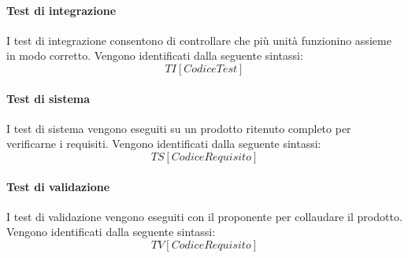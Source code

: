 	\paragraph{Test di integrazione}
		I test di integrazione consentono di controllare che più unità funzionino assieme in modo corretto. Vengono identificati dalla seguente sintassi:
			\[TI[Codice Test]\]
	\paragraph{Test di sistema}
		I test di sistema vengono eseguiti su un prodotto ritenuto completo per verificarne i requisiti. Vengono identificati dalla seguente sintassi:
			\[TS[Codice Requisito]\]
	\paragraph{Test di validazione}
		I test di validazione vengono eseguiti con il proponente per collaudare il prodotto. Vengono identificati dalla seguente sintassi:
			\[TV[Codice Requisito]\]

